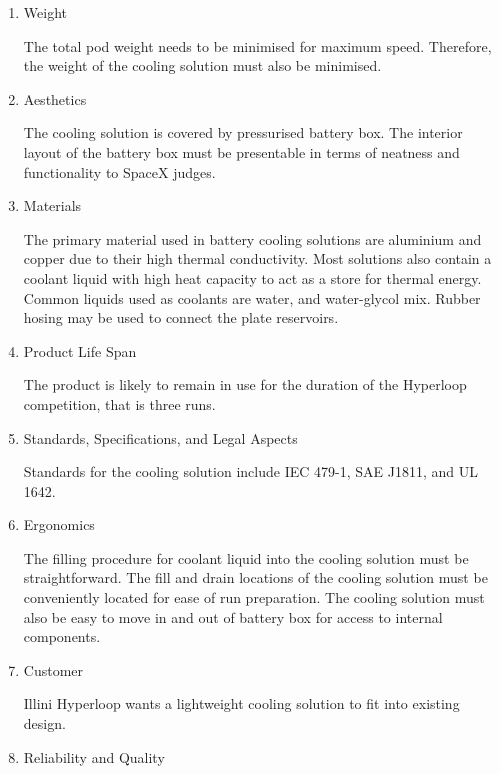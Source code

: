 \documentclass[11pt]{article}
\numberwithin{equation}{subsection} %
\begin{document}
\begin{enumerate}
        
    \item Weight
        
        The total pod weight needs to be minimised for maximum speed. Therefore, the weight of the cooling solution must also be minimised.
        
        
    \item Aesthetics
        
        The cooling solution is covered by pressurised battery box. The interior layout of the battery box must be presentable in terms of neatness and functionality to SpaceX judges.
        
        
    \item Materials

        The primary material used in battery cooling solutions are aluminium and copper due to their high thermal conductivity. Most solutions also contain a coolant liquid with high heat capacity to act as a store for thermal energy. Common liquids used as coolants are water, and water-glycol mix. Rubber hosing may be used to connect the plate reservoirs. 
        
        
    \item Product Life Span
        
        The product is likely to remain in use for the duration of the Hyperloop competition, that is three runs.
        
        
    \item Standards, Specifications, and Legal Aspects
        
        Standards for the cooling solution include IEC 479-1, SAE J1811, and UL 1642.
        
        
    \item Ergonomics
        
        The filling procedure for coolant liquid into the cooling solution must be straightforward. The fill and drain locations of the cooling solution must be conveniently located for ease of run preparation. The cooling solution must also be easy to move in and out of battery box for access to internal components.
        
        
    \item Customer
        
        Illini Hyperloop wants a lightweight cooling solution to fit into existing design.
        
        
    \item Reliability and Quality
        

\end{enumerate}
\end{document}
